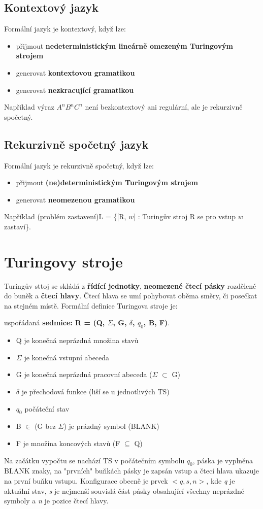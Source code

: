 \documentclass{szzclass}
\begin{document}
\subsection{Kontextový jazyk}
Formální jazyk je kontextový, když lze:
\begin{itemize}
\item přijmout \textbf{nedeterministickým lineárně omezeným Turingovým strojem}
\item generovat \textbf{kontextovou gramatikou}
\item generovat \textbf{nezkracující gramatikou}
\end{itemize}
Například výraz $A^nB^nC^n$ není bezkontextový ani regulární, ale je rekurzivně spočetný.

\subsection{Rekurzivně spočetný jazyk}
Formální jazyk je rekurzivně spočetný, když lze:
\begin{itemize}
\item přijmout \textbf{(ne)deterministickým Turingovým strojem}
\item generovat \textbf{neomezenou gramatikou}
\end{itemize}
Například (problém zastavení)L = \{[R, $w$] : Turingův stroj R se pro vstup $w$ zastaví\}.

\section{Turingovy stroje}
Turingův sttoj se skládá z \textbf{řídící jednotky}, \textbf{neomezené čtecí pásky} rozdělené do buněk a \textbf{čtecí hlavy}.
Čtecí hlava se umí pohybovat oběma směry, či posečkat na stejném místě.
\newline
Formální definice Turingova stroje je:

uspořádaná \textbf{sedmice: R = (Q, $\Sigma$, G, $\delta$, $q_0$, B, F)}.
\begin{itemize}
\item Q je konečná neprázdná množina stavů
\item $\Sigma$ je konečná vstupní abeceda
\item G je konečná neprázdná pracovní abeceda ($\Sigma$ $\subset$ G)
\item $\delta$ je přechodová funkce (liší se u jednotlivých TS)
\item $q_0$ počáteční stav
\item B $\in$ (G bez $\Sigma$) je prázdný symbol (BLANK)
\item F je množina koncových stavů (F $\subseteq$ Q)
\end{itemize}
Na začátku vypočtu se nachází TS v počátečním symbolu $q_0$, páska je vyplněna BLANK znaky, na "prvních" buňkách pásky je zapsán vstup a čtecí hlava ukazuje na první buňku vstupu.
\newline
Konfigurace obecně je prvek $<q,s,n>$, kde \textit{q} je aktuální stav, \textit{s} je nejmenší souvislá část pásky obsahující všechny neprázdné symboly a \textit{n} je pozice čtecí hlavy.
\end{document}
